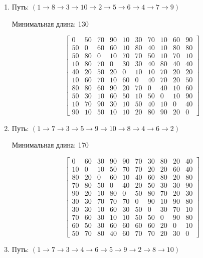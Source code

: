 \documentclass[a4paper,12pt]{article}
\begin{document}
\begin{enumerate}
	\item
	Путь: $( 1 \rightarrow 8 \rightarrow 3 \rightarrow 10 \rightarrow 2 \rightarrow 5 \rightarrow 6 \rightarrow 4 \rightarrow 7 \rightarrow 9 )$
	
	Минимальная длина: 130
	
	\[
	\begin{bmatrix}
	0& 50& 70& 90& 10& 30& 70& 10& 60& 90\\
	50& 0& 60& 60& 10& 80& 40& 10& 80& 80\\
	50& 80& 0& 10& 70& 70& 50& 10& 70& 10\\
	10& 80& 70& 0& 30& 30& 40& 80& 40& 40\\
	40& 20& 50& 20& 0& 10& 10& 70& 20& 20\\
	10& 60& 70& 10& 60& 0& 40& 70& 20& 50\\
	80& 80& 60& 90& 20& 70& 0& 40& 10& 60\\
	50& 30& 10& 60& 50& 10& 50& 0& 10& 90\\
	10& 70& 90& 30& 10& 50& 40& 10& 0& 40\\
	90& 10& 50& 10& 10& 20& 80& 90& 20& 0
	\end{bmatrix}
	\]
	
	\item
	Путь: $( 1 \rightarrow 7 \rightarrow 3 \rightarrow 5 \rightarrow 9 \rightarrow 10 \rightarrow 8 \rightarrow 4 \rightarrow 6 \rightarrow 2 )$
	
	Минимальная длина: 170
	
	\[
	\begin{bmatrix}
	0& 60& 30& 90& 90& 70& 30& 80& 20& 40\\
	10& 0& 10& 50& 70& 70& 20& 20& 60& 40\\
	80& 20& 0& 60& 10& 40& 60& 80& 20& 80\\
	70& 80& 50& 0& 40& 20& 50& 30& 30& 90\\
	90& 20& 10& 80& 0& 50& 80& 70& 20& 30\\
	30& 30& 70& 70& 70& 0& 90& 10& 90& 80\\
	30& 30& 10& 60& 30& 50& 0& 30& 70& 10\\
	70& 60& 30& 10& 10& 50& 50& 0& 90& 80\\
	60& 50& 30& 60& 60& 60& 60& 20& 0& 10\\
	50& 70& 80& 40& 60& 70& 70& 20& 30& 0
	\end{bmatrix}
	\]
	
	\item
	Путь: $( 1 \rightarrow 7 \rightarrow 3 \rightarrow 4 \rightarrow 6 \rightarrow 5 \rightarrow 9 \rightarrow 2 \rightarrow 8 \rightarrow 10 )$
	

\end{enumerate}
\end{document}
